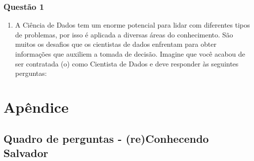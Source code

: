 \documentclass[
]{book}
\providecommand{\tightlist}{%
  \setlength{\itemsep}{0pt}\setlength{\parskip}{0pt}}
\begin{document}
\hypertarget{questuxe3o-1}{%
\subsection*{Questão 1}\label{questuxe3o-1}}

\begin{enumerate}
\def\labelenumi{\alph{enumi}.}
\tightlist
\item
  A Ciência de Dados tem um enorme potencial para lidar com diferentes tipos de problemas, por isso é aplicada a diversas áreas do conhecimento. São muitos os desafios que os cientistas de dados enfrentam para obter informações que auxiliem a tomada de decisão. Imagine que você acabou de ser contratada (o) como Cientista de Dados e deve responder às seguintes perguntas:
\end{enumerate}

\hypertarget{apuxeandice}{%
\chapter*{Apêndice}\label{apuxeandice}}

\hypertarget{apendperguntas}{%
\section{Quadro de perguntas - (re)Conhecendo Salvador}\label{apendperguntas}}
\end{document}
